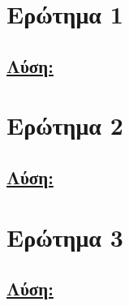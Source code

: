 \documentclass[a4paper,11pt,titlepage]{article}
\begin{document}
\section{Ερώτημα 1}


\subsection*{\underline{Λύση:}}


\section{Ερώτημα 2}


\subsection*{\underline{Λύση:}}


\section{Ερώτημα 3}


\subsection*{\underline{Λύση:}}
\end{document}
